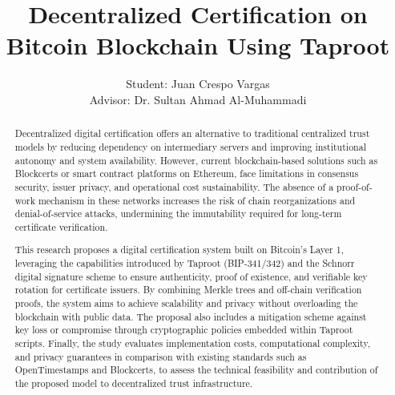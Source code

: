 \documentclass[10pt]{exam} %
\title{Decentralized Certification on Bitcoin Blockchain Using Taproot}
\author{Student: Juan Crespo Vargas \\ Advisor: Dr. Sultan Ahmad Al-Muhammadi }
\date{}
\begin{document}
\maketitle


\begin{abstract}
    
Decentralized digital certification offers an alternative to traditional centralized trust models by reducing dependency on intermediary servers and improving institutional autonomy and system availability.
However, current blockchain-based solutions such as Blockcerts or smart contract platforms on Ethereum, face limitations in consensus security, issuer privacy, and operational cost sustainability.
The absence of a proof-of-work mechanism in these networks increases the risk of chain reorganizations and denial-of-service attacks, undermining the immutability required for long-term certificate verification.

This research proposes a digital certification system built on Bitcoin’s Layer 1, leveraging the capabilities introduced by Taproot (BIP-341/342) and the Schnorr digital signature scheme to ensure authenticity, proof of existence, and verifiable key rotation for certificate issuers.
By combining Merkle trees and off-chain verification proofs, the system aims to achieve scalability and privacy without overloading the blockchain with public data.
The proposal also includes a mitigation scheme against key loss or compromise through cryptographic policies embedded within Taproot scripts.
Finally, the study evaluates implementation costs, computational complexity, and privacy guarantees in comparison with existing standards such as OpenTimestamps and Blockcerts, to assess the technical feasibility and contribution of the proposed model to decentralized trust infrastructure.

\end{abstract}
\end{document}
